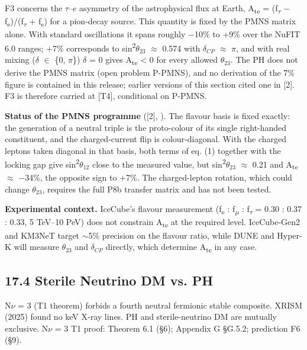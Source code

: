 \documentclass[11pt,letterpaper]{article}
\begin{document}
\noindent F3 concerns the $\tau$--$e$ asymmetry of the astrophysical flux at Earth, A\textsubscript{te} = (f\textsubscript{$\tau$} $-$ f\textsubscript{e})/(f\textsubscript{$\tau$} + f\textsubscript{e}) for a pion-decay source. This quantity is fixed by the PMNS matrix alone. With standard oscillations it spans roughly $-$10\% to +9\% over the NuFIT 6.0 ranges; +7\% corresponds to sin\textsuperscript{2}$\theta_{23}$ $\approx$ 0.574 with $\delta_{CP}$ $\approx$ $\pi$, and with real mixing ($\delta$ $\in$ \{0, $\pi$\}) $\delta$ = 0 gives A\textsubscript{te} < 0 for every allowed $\theta_{23}$. The PH does not derive the PMNS matrix (open problem P-PMNS), and no derivation of the 7\% figure is contained in this release; earlier versions of this section cited one in [2]. F3 is therefore carried at [T4], conditional on P-PMNS.

\noindent \textbf{Status of the PMNS programme} ([2], ). The flavour basis is fixed exactly: the generation of a neutral triple is the proto-colour of its single right-handed constituent, and the charged-current flip is colour-diagonal. With the charged leptons taken diagonal in that basis, both terms of eq. (1) together with the locking gap give sin\textsuperscript{2}$\theta_{12}$ close to the measured value, but sin\textsuperscript{2}$\theta_{23}$ $\approx$ 0.21 and A\textsubscript{te} $\approx$ $-$34\%, the opposite sign to +7\%. The charged-lepton rotation, which could change $\theta_{23}$, requires the full P8b transfer matrix and has not been tested.

\noindent \textbf{Experimental context.} IceCube's flavour measurement (f\textsubscript{e} : f\textsubscript{$\mu$} : f\textsubscript{$\tau$} = 0.30 : 0.37 : 0.33, 5 TeV--10 PeV) does not constrain A\textsubscript{te} at the required level. IceCube-Gen2 and KM3NeT target $\sim$5\% precision on the flavour ratio, while DUNE and Hyper-K will measure $\theta_{23}$ and $\delta_{CP}$ directly, which determine A\textsubscript{te} in any case.

\subsection*{17.4  Sterile Neutrino DM vs. PH}

\noindent N$\nu$ = 3 (T1 theorem) forbids a fourth neutral fermionic stable composite. XRISM (2025) found no keV X-ray lines. PH and sterile-neutrino DM are mutually exclusive. N$\nu$ = 3 T1 proof: Theorem 6.1 (§6); Appendix G §G.5.2; prediction F6 (§9).
\end{document}

